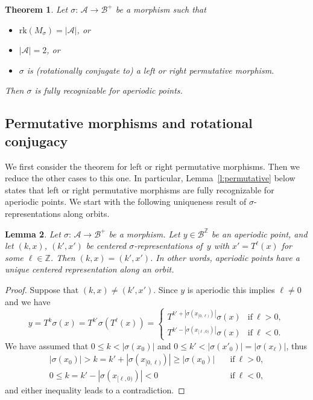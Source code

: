\documentclass{amsart}
\newtheorem{lemma}{Lemma}[section]
\newtheorem{theorem}[lemma]{Theorem}
\theoremstyle{definition}
\theoremstyle{remark}
\numberwithin{equation}{section}
\begin{document}
\begin{theorem} \label{t:recognizable}
Let $\sigma:\, \mathcal{A} \to \mathcal{B}^+$ be a morphism such that 
\begin{itemize}
\item $\mathrm{rk}(M_\sigma) = |\mathcal{A}|$,  or
\item $|\mathcal{A}| = 2$, or
\item  $\sigma$ is (rotationally conjugate to) a left or right permutative morphism.
\end{itemize}
Then $\sigma$ is fully recognizable for aperiodic points.
\end{theorem}

\subsection{Permutative morphisms and rotational conjugacy}
We first consider the theorem for left or right permutative morphisms. 
Then we reduce the other cases to this one. 
In particular, Lemma~\ref{l:permutative} below states  that  left or right permutative morphisms are fully recognizable for aperiodic points. 
We start with the following uniqueness result of $\sigma$-representations along orbits.

\begin{lemma}\label{lem:uniqueorbit}
Let $\sigma:\, \mathcal{A} \to \mathcal{B}^+$ be a morphism.
Let $y \in \mathcal{B}^{\mathbb{Z}}$ be an aperiodic point, and let  $(k,x)$, $(k',x')$ be centered $\sigma$-representations of~$y$ with $x' = T^\ell (x)$ for some $\ell \in \mathbb{Z}$. 
Then $(k,x) = (k',x')$. 
In other words, aperiodic points have a unique centered representation along an orbit.     
\end{lemma}

\begin{proof}
Suppose that $(k,x)\neq(k',x')$. 
Since $y$ is aperiodic this implies $\ell\neq 0$ and we have
\[
y = T^k \sigma(x) = T^{k'} \sigma(T^\ell(x)) = 
\begin{cases}T^{k'+|\sigma(x_{[0,\ell)})|} \sigma(x) & \text{if}\ \ell>0, \\ T^{k'-|\sigma(x_{[\ell,0)})|} \sigma(x) & \text{if}\ \ell<0.\end{cases}
\]
We have assumed that $0\leq k<|\sigma(x_0)|$ and $0\leq k' < |\sigma(x'_0)| = |\sigma(x_\ell)|$, thus 
\begin{align*}
|\sigma(x_0)| > k = k'+|\sigma(x_{[0,\ell)})| \geq |\sigma(x_0)| & \quad \text{if}\ \ell>0, \\
0 \leq k = k'-|\sigma(x_{[\ell,0)})| < 0 & \quad\text{if}\ \ell<0, 
\end{align*} 
and either inequality leads to a contradiction. 
\end{proof}
\end{document}
